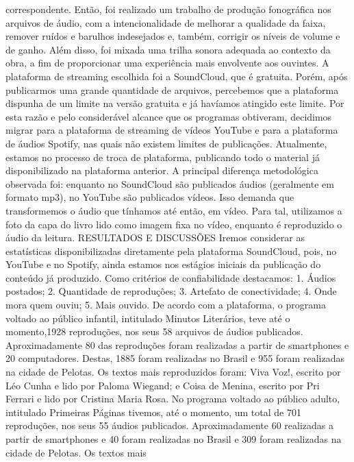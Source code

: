 correspondente. Então, foi realizado um trabalho de produção fonográfica nos arquivos de áudio, 
com a intencionalidade de melhorar a qualidade da faixa, remover ruídos e barulhos indesejados 
e, também, corrigir os níveis de volume e de ganho. Além disso, foi mixada uma trilha sonora 
adequada ao contexto da obra, a fim de proporcionar uma experiência mais envolvente aos 
ouvintes. A plataforma de streaming escolhida foi a SoundCloud, que é gratuita. Porém, após 
publicarmos uma grande quantidade de arquivos, percebemos que a plataforma dispunha de um 
limite na versão gratuita e já havíamos atingido este limite. Por esta razão e pelo considerável 
alcance que os programas obtiveram, decidimos migrar para a plataforma de streaming de vídeos 
YouTube e para a plataforma de áudios Spotify, nas quais não existem limites de publicações.
Atualmente, estamos no processo de troca de plataforma, publicando todo o material já 
disponibilizado na plataforma anterior. A principal diferença metodológica observada foi: 
enquanto no SoundCloud são publicados áudios (geralmente em formato mp3), no YouTube são 
publicados vídeos. Isso demanda que transformemos o áudio que tínhamos até então, em vídeo. 
Para tal, utilizamos a foto da capa do livro lido como imagem fixa no vídeo, enquanto é 
reproduzido o áudio da leitura.
RESULTADOS E DISCUSSÕES
Iremos considerar as estatísticas disponibilizadas diretamente pela plataforma 
SoundCloud, pois, no YouTube e no Spotify, ainda estamos nos estágios iniciais da publicação do 
conteúdo já produzido.
Como critérios de confiabilidade destacamos: 1. Áudios postados; 2. Quantidade de 
reproduções; 3. Artefato de conectividade; 4. Onde mora quem ouviu; 5. Mais ouvido. De acordo 
com a plataforma, o programa voltado ao público infantil, intitulado Minutos Literários, teve até 
o momento,1928 reproduções, nos seus 58 arquivos de áudios publicados. Aproximadamente 80%
das reproduções foram realizadas a partir de smartphones e 20%
computadores. Destas, 1885 foram realizadas no Brasil e 955 foram realizadas na cidade de 
Pelotas. Os textos mais reproduzidos foram: Viva Voz!, escrito por Léo Cunha e lido por Paloma 
Wiegand; e Coisa de Menina, escrito por Pri Ferrari e lido por Cristina Maria Rosa. No programa 
voltado ao público adulto, intitulado Primeiras Páginas tivemos, até o momento, um total de 701 
reproduções, nos seus 55 áudios publicados. Aproximadamente 60%
realizadas a partir de smartphones e 40%
foram realizadas no Brasil e 309 foram realizadas na cidade de Pelotas. Os textos mais 
